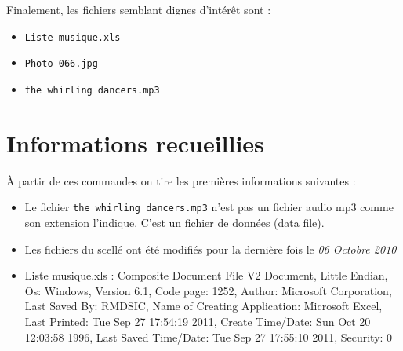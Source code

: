 \documentclass[a4paper,11pt]{article}
\begin{document}
Finalement, les fichiers semblant dignes d’intérêt sont :
\begin{itemize}
    \item {\tt Liste musique.xls}
    \item {\tt Photo 066.jpg}
    \item {\tt the whirling dancers.mp3}
\end{itemize}

\section{Informations recueillies}

À partir de ces commandes on tire les premières informations suivantes :
\begin{itemize}
    \item  Le fichier {\tt the whirling dancers.mp3} n'est pas un fichier
        audio mp3 comme son extension l'indique.
        C'est un fichier de données (data file).
    \item Les fichiers du scellé ont été modifiés pour la dernière fois le \emph{06 Octobre 2010}

    \item Liste musique.xls :
    Composite Document File V2 Document, Little Endian, Os:
    Windows, Version 6.1, Code page: 1252, Author: Microsoft Corporation, Last Saved By:
    RMDSIC, Name of Creating Application: Microsoft Excel, Last Printed: Tue Sep 27 17:54:19
    2011, Create Time/Date: Sun Oct 20 12:03:58 1996, Last Saved Time/Date: Tue Sep 27
    17:55:10 2011, Security: 0
\end{itemize}
%
%
%
%
%
%
\end{document}
